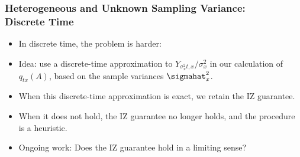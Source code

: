 {\begin{frame}
\frametitle{Heterogeneous and Unknown Sampling Variance: \\ Discrete Time}
\begin{itemize}
  \item In discrete time, the problem is harder:
  \item Idea: use a discrete-time approximation to $Y_{\sigma_x^2 t,x} / \sigma_x^2$ in our calculation of $q_{tx}(A)$, based on the sample variances $\sigmahat^2_x$.
  \item When this discrete-time approximation is exact, we retain the IZ guarantee.
  \item When it does not hold, the IZ guarantee no longer holds, and the procedure is a heuristic.
  \item Ongoing work: Does the IZ guarantee hold in a limiting sense?
\end{itemize}
\end{frame}


}
